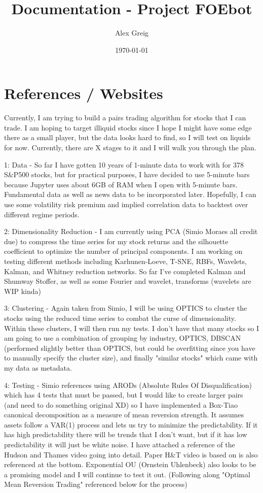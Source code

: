 \documentclass[11pt]{article}
\title{Documentation - Project FOEbot}
\author{Alex Greig}
\date{\today}
\begin{document}
\maketitle

\tableofcontents

\vspace{6cm}
\section{References / Websites}
Currently, I am trying to build a pairs trading algorithm for stocks that I can trade. I am hoping to target illiquid stocks since I hope I might have some edge there as a small player, but the data looks hard to find, so I will test on liquids for now. Currently, there are X stages to it and I will walk you through the plan.

1: Data - So far I have gotten 10 years of 1-minute data to work with for 378 S\&P500 stocks, but for practical purposes, I have decided to use 5-minute bars because Jupyter uses about 6GB of RAM when I open with 5-minute bars. Fundamental data as well as news data to be incorporated later. Hopefully, I can use some volatility risk premium and implied correlation data to backtest over different regime periods.

2: Dimensionality Reduction - I am currently using PCA (Simio Moraes all credit due) to compress the time series for my stock returns and the silhouette coefficient to optimize the number of principal components. I am working on testing different methods including Karhunen-Loeve, T-SNE, RBFs, Wavelets, Kalman, and Whitney reduction networks. So far I've completed Kalman and Shumway Stoffer, as well as some Fourier and wavelet, transforms (wavelets are WIP kinda)

3: Clustering - Again taken from Simio, I will be using OPTICS to cluster the stocks using the reduced time series to combat the curse of dimensionality. Within these clusters, I will then run my tests. I don't have that many stocks so I am going to use a combination of grouping by industry, OPTICS, DBSCAN (performed slightly better than OPTICS, but could be overfitting since you have to manually specify the cluster size), and finally "similar stocks" which came with my data as metadata.

4: Testing - Simio references using ARODs (Absolute Rules Of Disqualification) which has 4 tests that must be passed, but I would like to create larger pairs (and need to do something original XD) so I have implemented a Box-Tiao canonical decomposition as a measure of mean reversion strength. It assumes assets follow a VAR(1) process and lets us try to minimize the predictability. If it has high predictability there will be trends that I don't want, but if it has low predictability it will just be white noise. I have attached a reference of the Hudson and Thames video going into detail. Paper H\&T video is based on is also referenced at the bottom. Exponential OU (Ornstein Uhlenbeck) also looks to be a promising model and I will continue to test it out. (Following along "Optimal Mean Reversion Trading" referenced below for the process)
\end{document}
